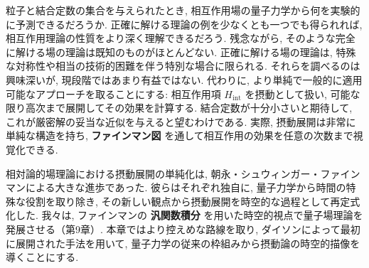 \documentclass[a4paper,12pt]{article}
\begin{document}
粒子と結合定数の集合を与えられたとき, 相互作用場の量子力学から何を実験的に予測できるだろうか. 
正確に解ける理論の例を少なくとも一つでも得られれば, 相互作用理論の性質をより深く理解できるだろう. 
残念ながら, そのような完全に解ける場の理論は既知のものがほとんどない. 
正確に解ける場の理論は, 特殊な対称性や相当の技術的困難を伴う特別な場合に限られる. 
それらを調べるのは興味深いが, 現段階ではあまり有益ではない. 
代わりに, より単純で一般的に適用可能なアプローチを取ることにする: 
相互作用項 $H_{\text{int}}$ を摂動として扱い, 可能な限り高次まで展開してその効果を計算する. 
結合定数が十分小さいと期待して, これが厳密解の妥当な近似を与えると望むわけである. 
実際, 摂動展開は非常に単純な構造を持ち, \textbf{ファインマン図} を通して相互作用の効果を任意の次数まで視覚化できる.

相対論的場理論における摂動展開の単純化は, 朝永・シュウィンガー・ファインマンによる大きな進歩であった. 
彼らはそれぞれ独自に, 量子力学から時間の特殊な役割を取り除き, 
その新しい観点から摂動展開を時空的な過程として再定式化した. 
我々は, ファインマンの \textbf{汎関数積分} を用いた時空的視点で量子場理論を発展させる（第9章）. 
本章ではより控えめな路線を取り, ダイソンによって最初に展開された手法を用いて, 
量子力学の従来の枠組みから摂動論の時空的描像を導くことにする.
\end{document}
